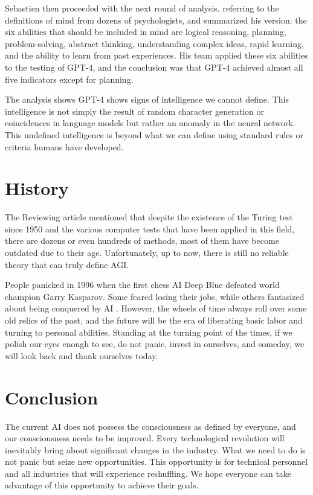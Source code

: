 \documentclass[10pt,journal,compsoc]{IEEEtran}
\begin{document}
Sebastien then proceeded with the next round of analysis, referring to the definitions of mind from dozens of psychologists, and summarized his version: the six abilities that should be included in mind are logical reasoning, planning, problem-solving, abstract thinking, understanding complex ideas, rapid learning, and the ability to learn from past experiences. His team applied these six abilities to the testing of GPT-4, and the conclusion was that GPT-4 achieved almost all five indicators except for planning. \cite{微软}

The analysis shows GPT-4 shows signs of intelligence we cannot define. This intelligence is not simply the result of random character generation or coincidences in language models but rather an anomaly in the neural network. This undefined intelligence is beyond what we can define using standard rules or criteria humans have developed.


\section{History}

The Reviewing article mentioned that despite the existence of the Turing test since 1950 and the various computer tests that have been applied in this field, there are dozens or even hundreds of methods, most of them have become outdated due to their age. Unfortunately, up to now, there is still no reliable theory that can truly define AGI. \cite{回顾}

People panicked in 1996 when the first chess AI Deep Blue defeated world champion Garry Kasparov. Some feared losing their jobs, while others fantasized about being conquered by AI \cite{深蓝}. However, the wheels of time always roll over some old relics of the past, and the future will be the era of liberating basic labor and turning to personal abilities. Standing at the turning point of the times, if we polish our eyes enough to see, do not panic, invest in ourselves, and someday, we will look back and thank ourselves today.


\section{Conclusion}

The current AI does not possess the consciousness as defined by everyone, and our consciousness needs to be improved. Every technological revolution will inevitably bring about significant changes in the industry. What we need to do is not panic but seize new opportunities. This opportunity is for technical personnel and all industries that will experience reshuffling. We hope everyone can take advantage of this opportunity to achieve their goals.




\end{document}
